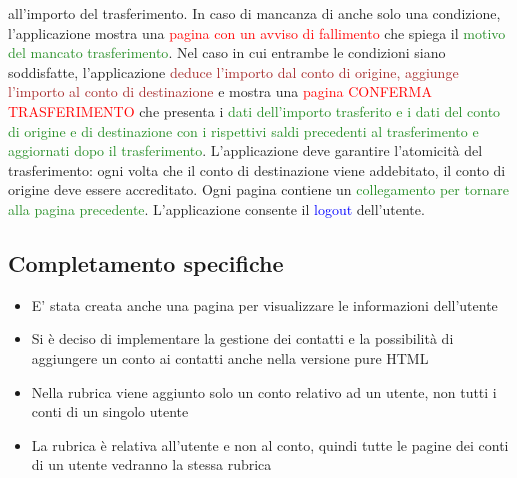 \documentclass{article}
\begin{document}
all’importo del trasferimento. In caso di mancanza di anche solo una condizione, l’applicazione
mostra una \textcolor{red}{pagina con un avviso di fallimento} che spiega il \textcolor{ForestGreen}{motivo del mancato trasferimento}.
Nel caso in cui entrambe le condizioni siano soddisfatte, l’applicazione \textcolor{brown}{deduce l’importo dal
conto di origine, aggiunge l’importo al conto di destinazione} e mostra una \textcolor{red}{pagina CONFERMA
TRASFERIMENTO} che presenta i \textcolor{ForestGreen}{dati dell’importo trasferito e i dati del conto di origine e di
destinazione con i rispettivi saldi precedenti al trasferimento e aggiornati dopo il trasferimento}.
L’applicazione deve garantire l’atomicità del trasferimento: ogni volta che il conto di
destinazione viene addebitato, il conto di origine deve essere accreditato. Ogni pagina
contiene un \textcolor{ForestGreen}{collegamento per tornare alla pagina precedente}. L’applicazione consente il
\textcolor{blue}{logout} dell’utente.

\subsection{Completamento specifiche}
\begin{itemize}
\item E' stata creata anche una pagina per visualizzare le informazioni dell'utente
\item Si è deciso di implementare la gestione dei contatti e la possibilità di aggiungere un conto ai contatti anche nella versione pure HTML
\item Nella rubrica viene aggiunto solo un conto relativo ad un utente, non tutti i conti di un singolo utente
\item La rubrica è relativa all'utente e non al conto, quindi tutte le pagine dei conti di un utente vedranno la stessa rubrica
\end{itemize}
\end{document}
